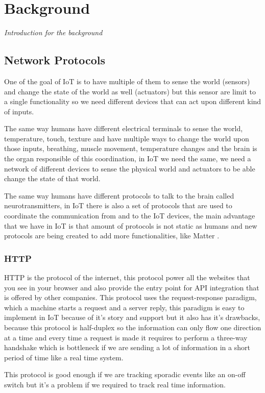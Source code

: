 \section{Background}
{\it Introduction for the background}

\subsection{Network Protocols}
One of the goal of IoT is to have multiple of them to sense the world (sensors) 
and change the state of the world as well (actuators) but this sensor are limit 
to a single functionality so we need different devices that can act upon 
different kind of inputs.

The same way humans have different electrical terminals to sense the world, 
temperature, touch, texture and have multiple ways to change the world upon 
those inputs, breathing, muscle movement, temperature changes and the brain 
is the organ responsible of this coordination, in IoT we need the same, we need 
a network of different devices to sense the physical world and actuators to be 
able change the state of that world. 

The same way humans have different protocols to talk to the brain called 
neurotransmitters, in IoT there is also a set of protocols that are used to 
coordinate the communication from and to the IoT devices, the main advantage 
that we have in IoT is that amount of protocols is not static as humans and 
new protocols are being created to add more functionalities, like 
Matter \cite{matter}. 

\subsubsection{HTTP}
HTTP is the protocol of the internet, this protocol power all the websites 
that you see in your browser and also provide the entry point for API 
integration that is offered by other companies. This protocol uses the 
request-response paradigm, which a machine starts a request and a server 
reply, this paradigm is easy to implement in IoT because of it's story and 
support but it also has it's drawbacks, because this protocol is 
half-duplex so the information can only flow one direction at a time and 
every time a request is made it requires to perform a three-way handshake 
which is bottleneck if we are sending a lot of information in a short 
period of time like a real time system.

This protocol is good enough if we are tracking sporadic events like an on-off 
switch but it's a problem if we required to track real time information.

